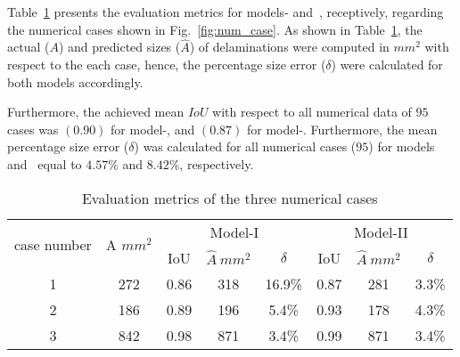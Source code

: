 Table~\ref{tab:num_cases} presents the evaluation metrics for models- and~, receptively, regarding the numerical cases shown in Fig.~\ref{fig:num_case}.
As shown in Table~\ref{tab:num_cases}, the actual (\(A\)) and predicted sizes (\(\hat{A}\)) of delaminations were computed in \(mm^2\) with respect to the each case, hence, the percentage size error (\(\delta\)) were calculated for both models accordingly.

Furthermore, the achieved mean \(IoU\) with respect to all numerical data of \(95\) cases was \((0.90)\) for model-, and \((0.87)\) for model-. 
Furthermore, the mean percentage size error (\(\delta\)) was calculated for all numerical cases (\(95\)) for models~ and~ equal to \(4.57 \%\) and \(8.42\%\), respectively.
\begin{table}[]
	\caption{Evaluation metrics of the three numerical cases}
	\begin{tabular}{c|c|ccc|ccc}
		\multirow{2}{*}{case number} & \multicolumn{1}{c|}{\multirow{2}{*}{A \(mm^2\)}} & \multicolumn{3}{c|}{Model-I}         & \multicolumn{3}{c}{Model-II} \\ \cline{3-8} 
		& \multicolumn{1}{c|}{}  & \multicolumn{1}{c|}{IoU}  & \multicolumn{1}{c|}{\(\hat{A}\ mm^2\)} & \(\delta\) & \multicolumn{1}{c|}{IoU}  & \multicolumn{1}{c|}{\(\hat{A}\ mm^2\)} & \(\delta\) \\ \hline
		1 & 272 & \multicolumn{1}{c|}{0.86} & \multicolumn{1}{c|}{318} & 16.9\% & \multicolumn{1}{c|}{0.87} & \multicolumn{1}{c|}{281} & 3.3\% \\ \hline
		2 &  186  & \multicolumn{1}{c|}{0.89} & \multicolumn{1}{c|}{196} & 5.4\% & \multicolumn{1}{c|}{0.93} & \multicolumn{1}{c|}{178} & 4.3\% \\ \hline
		3 & 842 & \multicolumn{1}{c|}{0.98} &\multicolumn{1}{c|}{871} & 3.4\%   & \multicolumn{1}{c|}{0.99} & \multicolumn{1}{c|}{871} & 3.4\% \\ \hline
	\end{tabular}	
	\label{tab:num_cases}
\end{table}
